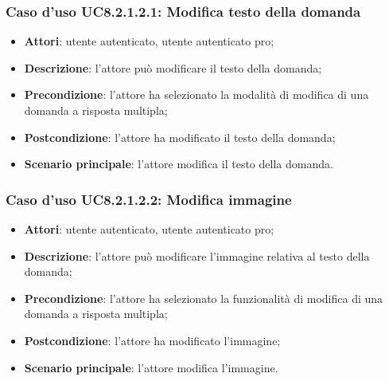 \subsubsection{Caso d'uso UC8.2.1.2.1: Modifica testo della domanda}
	\begin{itemize}
		\item
			\textbf{Attori}: utente autenticato, utente autenticato pro;
		\item		
			\textbf{Descrizione}: l'attore può modificare il testo della domanda;
		\item
			\textbf{Precondizione}: l'attore ha selezionato la modalità di modifica di una domanda a risposta multipla; 
		\item
			\textbf{Postcondizione}: l'attore ha modificato il testo della domanda;
		\item
			\textbf{Scenario principale}: l'attore modifica il testo della domanda. 
	 			
	\end{itemize}
	
\subsubsection{Caso d'uso UC8.2.1.2.2: Modifica immagine}
	\begin{itemize}
		\item
			\textbf{Attori}: utente autenticato, utente autenticato pro;
		\item		
			\textbf{Descrizione}: l'attore può modificare l'immagine relativa al testo della domanda;
		\item
			\textbf{Precondizione}: l'attore ha selezionato la funzionalità di modifica di una domanda a risposta multipla; 
		\item
			\textbf{Postcondizione}: l'attore ha modificato l'immagine;
		\item
			\textbf{Scenario principale}: l'attore modifica l'immagine. 	
	\end{itemize}
	
	
